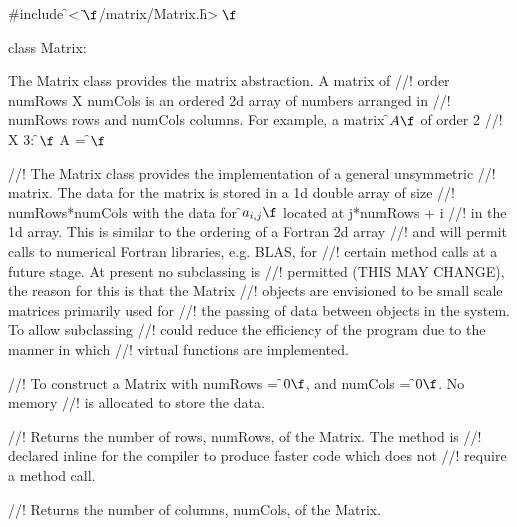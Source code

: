 
\indent \#include \f$<\tilde{}\f$/matrix/Matrix.h\f$>\f$

\indent class Matrix:


\indent The Matrix class provides the matrix abstraction. A matrix of
//! order numRows X numCols is an ordered 2d array of numbers arranged in
//! numRows rows and numCols columns. For example, a matrix \f$A\f$ of order 2
//! X 3:
\f$\f$ A =
\f$\f$

//! The Matrix class provides the implementation of a general unsymmetric
//! matrix. The data for the matrix is stored in a 1d double array of size
//! numRows*numCols with the data for \f$a_{i,j}\f$ located at j*numRows + i
//! in the 1d array. This is similar to the ordering of a Fortran 2d array
//! and will permit calls to numerical Fortran libraries, e.g. BLAS, for
//! certain method calls at a future stage. At present no subclassing is
//! permitted (THIS MAY CHANGE), the reason for this is that the Matrix
//! objects are envisioned to be small scale matrices primarily used for
//! the passing of data between objects in the system. To allow subclassing
//! could reduce the efficiency of the program due to the manner in which 
//! virtual functions are implemented. 



//! To construct a Matrix with numRows = \f$0\f$, and numCols = \f$0\f$. No memory
//! is allocated to store the data. 





//! Returns the number of rows, numRows, of the Matrix. The method is
//! declared inline for the compiler to produce faster code which does not
//! require a method call.

//! Returns the number of columns, numCols, of the Matrix.




